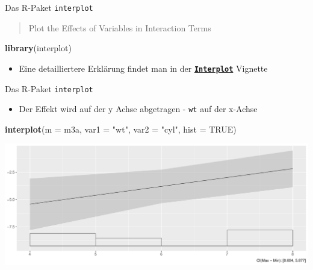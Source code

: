 \documentclass[ignorenonframetext,]{beamer}
\newenvironment{Shaded}{\begin{snugshade}}{\end{snugshade}}
\newcommand{\DataTypeTok}[1]{\textcolor[rgb]{0.13,0.29,0.53}{#1}}
\newcommand{\KeywordTok}[1]{\textcolor[rgb]{0.13,0.29,0.53}{\textbf{#1}}}
\newcommand{\NormalTok}[1]{#1}
\newcommand{\OtherTok}[1]{\textcolor[rgb]{0.56,0.35,0.01}{#1}}
\newcommand{\StringTok}[1]{\textcolor[rgb]{0.31,0.60,0.02}{#1}}
\providecommand{\tightlist}{%
  \setlength{\itemsep}{0pt}\setlength{\parskip}{0pt}}
\begin{document}
\begin{frame}[fragile]{Das R-Paket \texttt{interplot}}
\protect\hypertarget{das-r-paket-interplot}{}

\begin{quote}
Plot the Effects of Variables in Interaction Terms
\end{quote}

\begin{Shaded}
\begin{Highlighting}[]
\KeywordTok{library}\NormalTok{(interplot)}
\end{Highlighting}
\end{Shaded}

\begin{itemize}
\tightlist
\item
  Eine detailliertere Erklärung findet man in der
  \href{https://cran.r-project.org/web/packages/interplot/vignettes/interplot-vignette.html}{\textbf{\texttt{Interplot}}}
  Vignette
\end{itemize}

\end{frame}

\begin{frame}[fragile]{Das R-Paket \texttt{interplot}}
\protect\hypertarget{das-r-paket-interplot-1}{}

\begin{itemize}
\tightlist
\item
  Der Effekt wird auf der y Achse abgetragen - \texttt{wt} auf der
  x-Achse
\end{itemize}

\begin{Shaded}
\begin{Highlighting}[]
\KeywordTok{interplot}\NormalTok{(}\DataTypeTok{m =}\NormalTok{ m3a, }\DataTypeTok{var1 =} \StringTok{"wt"}\NormalTok{, }\DataTypeTok{var2 =} \StringTok{"cyl"}\NormalTok{, }\DataTypeTok{hist =} \OtherTok{TRUE}\NormalTok{)  }
\end{Highlighting}
\end{Shaded}

\includegraphics{B3_linreg_files/figure-beamer/unnamed-chunk-19-1.pdf}

\end{frame}
\end{document}
